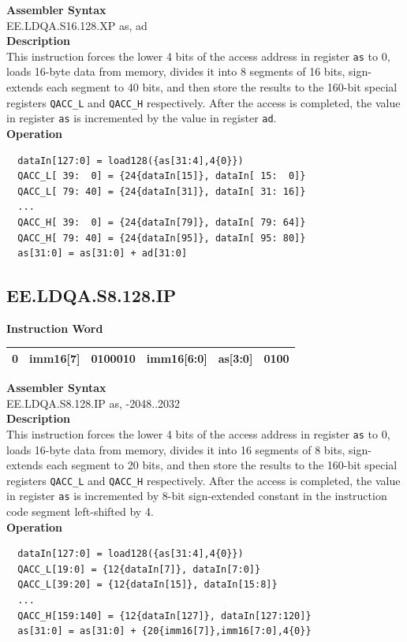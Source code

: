 \textbf{Assembler Syntax} \\
EE.LDQA.S16.128.XP as, ad \\
\textbf{Description} \\
This instruction forces the lower 4 bits of the access address in register \lstinline{as} to 0, loads 16-byte data from memory, divides it into 8 segments of 16 bits, sign-extends each segment to 40 bits, and then store the results to the 160-bit special registers \lstinline{QACC_L} and \lstinline{QACC_H} respectively. After the access is completed, the value in register \lstinline{as} is incremented by the value in register \lstinline{ad}.\\
\textbf{Operation}
\begin{lstlisting}
  dataIn[127:0] = load128({as[31:4],4{0}})
  QACC_L[ 39:  0] = {24{dataIn[15]}, dataIn[ 15:  0]}
  QACC_L[ 79: 40] = {24{dataIn[31]}, dataIn[ 31: 16]}
  ...
  QACC_H[ 39:  0] = {24{dataIn[79]}, dataIn[ 79: 64]}
  QACC_H[ 79: 40] = {24{dataIn[95]}, dataIn[ 95: 80]}
  as[31:0] = as[31:0] + ad[31:0]
\end{lstlisting}

\clearpage
\subsection{EE.LDQA.S8.128.IP}\label{instruction:EELDQAS8128IP}
\setlength\tabcolsep{6pt}
\textbf{Instruction Word} \\
\begin{tabular}{|c|c|c|c|c|c|}
	\hline
	0 & imm16[7] & 0100010 & imm16[6:0] & as[3:0] & 0100 \\
	\hline
\end{tabular}

\textbf{Assembler Syntax} \\
EE.LDQA.S8.128.IP as, -2048..2032 \\
\textbf{Description} \\
This instruction forces the lower 4 bits of the access address in register \lstinline{as} to 0, loads 16-byte data from memory, divides it into 16 segments of 8 bits, sign-extends each segment to 20 bits, and then store the results to the 160-bit special registers \lstinline{QACC_L} and \lstinline{QACC_H} respectively. After the access is completed, the value in register \lstinline{as} is incremented by 8-bit sign-extended constant in the instruction code segment left-shifted by 4.\\
\textbf{Operation}
\begin{lstlisting}
  dataIn[127:0] = load128({as[31:4],4{0}})
  QACC_L[19:0] = {12{dataIn[7]}, dataIn[7:0]}
  QACC_L[39:20] = {12{dataIn[15]}, dataIn[15:8]}
  ...
  QACC_H[159:140] = {12{dataIn[127]}, dataIn[127:120]}
  as[31:0] = as[31:0] + {20{imm16[7]},imm16[7:0],4{0}}
\end{lstlisting}

